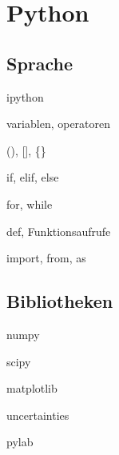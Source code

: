\section{Python}
  \subsection{Sprache}
    \begin{frame}{ipython}
    \end{frame}
    
    \begin{frame}{variablen, operatoren}
    \end{frame}
    
    \begin{frame}{(), [], \{\}}
    \end{frame}
    
    \begin{frame}{if, elif, else}
    \end{frame}
    
    \begin{frame}{for, while}
    \end{frame}
    
    \begin{frame}{def, Funktionsaufrufe}
    \end{frame}
    
    \begin{frame}{import, from, as}
    \end{frame}
  
  \subsection{Bibliotheken}
    \begin{frame}{numpy}
    \end{frame}
    
    \begin{frame}{scipy}
    \end{frame}
    
    \begin{frame}{matplotlib}
    \end{frame}
    
    \begin{frame}{uncertainties}
    \end{frame}
    
    \begin{frame}{pylab}
    \end{frame}
